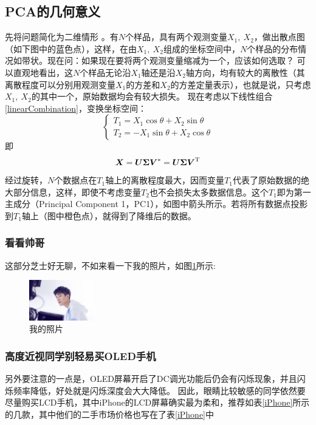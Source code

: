 \documentclass{CUC}
\begin{document}
\subsection{PCA的几何意义}
先将问题简化为二维情形 \cite{yahzongQuerySimilarMusic2001}。有$N$个样品，具有两个观测变量$X_1,\ X_2$，做出散点图（如下图中的蓝色点），这样，在由$X_1,\ X_2$组成的坐标空间中，$N$个样品的分布情况如带状。现在问：如果现在要将两个观测变量缩减为一个，应该如何选取？
可以直观地看出，这$N$个样品无论沿$X_1$轴还是沿$X_2$轴方向，均有较大的离散性（其离散程度可以分别用观测变量$X_1$的方差和$X_2$的方差定量表示），也就是说，只考虑$X_1,\ X_2$的其中一个，原始数据均会有较大损失。
现在考虑以下线性组合\eqref{linearCombination}，变换坐标空间：
\begin{equation}
    \begin{cases}
        T_1 = X_1 \cos \theta + X_2 \sin \theta \\
        T_2 = -X_1 \sin \theta + X_2 \cos \theta
    \end{cases} 
    \label{linearCombination}
\end{equation}
即
\begin{equation}
    \boldsymbol X = \boldsymbol U \boldsymbol \Sigma \boldsymbol V^* = \boldsymbol U \boldsymbol \Sigma \boldsymbol V^{\rm T}
\end{equation}
经过旋转，$N$个数据点在$T_1$轴上的离散程度最大，因而变量$T_1$代表了原始数据的绝大部分信息，这样，即使不考虑变量$T_2$也不会损失太多数据信息。这个$T_1$即为第一主成分（Principal Component 1，PC1），如图中箭头所示。若将所有数据点投影到$T_1$轴上（图中橙色点），就得到了降维后的数据。

\subsubsection{看看帅哥}
这部分芝士好无聊，不如来看一下我的照片，如图\ref{me}所示:
\begin{figure}[ht]
    \centering
    \includegraphics[width=0.25\textwidth]{img/zipai.jpeg}
    \caption{我的照片}
    \label{me}
\end{figure}

\subsubsection{高度近视同学别轻易买OLED手机}
另外要注意的一点是，OLED屏幕开启了DC调光功能后仍会有闪烁现象，并且闪烁频率降低，好处就是闪烁深度会大大降低。
因此，眼睛比较敏感的同学依然要尽量购买LCD手机，其中iPhone的LCD屏幕确实最为柔和，推荐如表\ref{iPhone}所示的几款，其中他们的二手市场价格也写在了表\ref{iPhone}中
\end{document}
